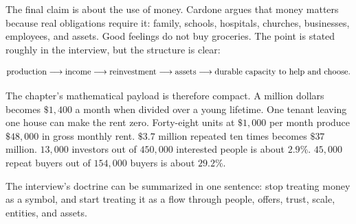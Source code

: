The final claim is about the use of money. Cardone argues that money matters because real obligations require it: family, schools, hospitals, churches, businesses, employees, and assets. Good feelings do not buy groceries. The point is stated roughly in the interview, but the structure is clear:

\[
\hbox{production}
\longrightarrow
\hbox{income}
\longrightarrow
\hbox{reinvestment}
\longrightarrow
\hbox{assets}
\longrightarrow
\hbox{durable capacity to help and choose}.
\]

The chapter's mathematical payload is therefore compact. A million dollars becomes \(\$1{,}400\) a month when divided over a young lifetime. One tenant leaving one house can make the rent zero. Forty-eight units at \(\$1{,}000\) per month produce \(\$48{,}000\) in gross monthly rent. \(\$3.7\) million repeated ten times becomes \(\$37\) million. \(13{,}000\) investors out of \(450{,}000\) interested people is about \(2.9\%\). \(45{,}000\) repeat buyers out of \(154{,}000\) buyers is about \(29.2\%\).

The interview's doctrine can be summarized in one sentence: stop treating money as a symbol, and start treating it as a flow through people, offers, trust, scale, entities, and assets.